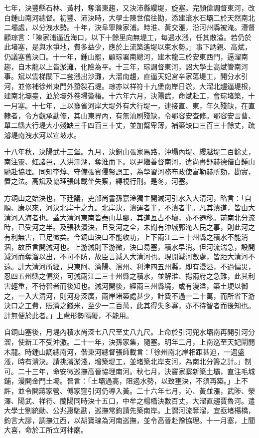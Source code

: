 \begin{pinyinscope}
七年，決豐縣石林、黃村，奪溜東趨，又決沛縣縷堤，旋塞。完顏偉調督東河，改白鍾山南河總督。初豐、沛決時，大學士陳世倌往勘，添建滾水石壩二於天然南北二壩處，以分洩水勢。十年，決阜寧陳家浦。時淮、黃交漲，沿河州縣被淹。漕督顧琮言：「陳家浦逼近海口，以下十餘里向無堤工，每遇水漲，任其散溢。若仍於此堵塞，是與水爭地，費多益少，應於上流築遙堤以束水勢。」事下訥親、高斌，仍議塞舊決口。十一年，鍾山罷，顧琮署南總河，建木龍三於安東西門，逼溜南趨，自木龍以上皆淤灘，化險為平。十三年，琮調督東河，詔大學士高斌管南河事。斌以雲梯關下二套漲出沙灘，大溜南趨，直逼天妃宮辛家蕩堤工，開分水引河，並修補徐州東門外蟄裂石堤。琮亦以祥符十九堡南岸日淤，大溜北趨逼堤根，建南北壩臺，並於壩外卷埽簽椿。十六年六月，決陽武，命斌赴工，會琮堵築，十一月塞。十七年，上以豫省河岸大堤外有大行堤一，連接直、東，年久殘缺，在直隸者，令方觀承勘修，其山東界內，有無汕刷殘缺，令鄂容安查修。鄂容安言曹、單二縣大行堤大小殘缺三千四百三十丈，並加幫卑薄，補築缺口三百三十餘丈，疏濬堤南洩水河以宣坡水。

十八年秋，決陽武十三堡。九月，決銅山張家馬路，沖塌內堤、縷越堤二百餘丈，南注靈、虹諸邑，入洪澤湖，奪淮而下。以尹繼善督南河，遣尚書舒赫德偕白鍾山馳赴協理。同知李焞、守備張賓侵帑誤工，為學習河務布政使富勒赫所劾，勘實，置之法。高斌及協理張師載坐失察，縛視行刑。是冬，河塞。

方銅山之始決也，下廷議，吏部尚書孫嘉淦獨主開減河引水入大清河，略言：「自順、康以來，河決北岸十之九。北岸決，潰運者半，不潰者半。凡其潰道，皆由大清河入海者也。蓋大清河東南皆泰山基腳，其道亙古不壞，亦不遷移。前南北分流時，已受河之半。及張秋潰決，且受河之全，未聞有沖城郭淹人民之事，則此河之有利無害，已足徵矣。今銅山決口不能收功，上下兩江二三十州縣之積水不能消涸，故臣言開減河也。上游減則下游微，決口易塞，積水早消。但河流湍急，設開減河而奪溜以出，不可不防，故臣言減入大清河也。現開減河數處，皆距大清河不遠。計大清河所經，只東阿、濟陽、濱州、利津四五州縣，即有漫溢，不過偏災，忍四五州縣之偏災，可減兩江二三十州縣之積水，並解淮、揚兩府之急難，此其利害輕重，不待智者而後知也。減河開後，經兩三州縣境，或有漫溢，築土埂以御之，一入大清河，則河身深廣，兩岸堵築處甚少，計費不過一二十萬，而所省下游決口之工費，賑濟之錢米，至少一二百萬，此其得失多寡，亦不待智者而後知也。計無便於此者。」上慮形勢隔礙，不能用。

自銅山塞後，月堤內積水尚深七八尺至丈八九尺。上命於引河兜水壩南再開引河分溜，使新工不受沖激。二十一年，決孫家集，隨塞。明年二月，上南巡至天妃閘閱木龍。時鍾山調總南河，偕東河總督張師載言：「徐州南北岸相距甚迫，一遇盛漲，時有潰決。請挑濬淤淺，增築堤工，並堵築北岸支河，為南北分籌之計。」制可。二十三年，命安徽巡撫高晉協理南河。秋七月，決竇家寨新築土壩，直注毛城鋪，漫開金門土壩。晉言：「土壩過高，阻遏水勢，以致壅決，不須再築。」上不許，並令開蔣家營、傅家窪引河仍導入黃。二十六年七月，沁、黃並漲，武陟、滎澤、陽武、祥符、蘭陽同時決十五口，中牟之楊橋決數百丈，大溜直趨賈魯河。遣大學士劉統勛、公兆惠馳勘，巡撫常鈞請先築南岸。上謂河流奪溜，宜亟堵楊橋，鈞言大謬，調撫江西，以胡寶瑔為河南巡撫，並令高晉赴豫協理。十一月塞，上聞大喜，命於工所立河神廟。


\end{pinyinscope}
